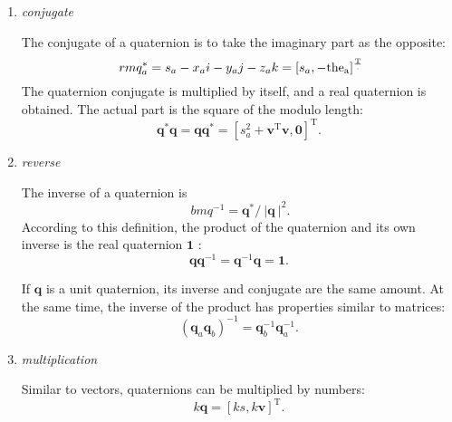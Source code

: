 \begin{enumerate}
	\item { \emph {conjugate} }
	
	The conjugate of a quaternion is to take the imaginary part as the opposite:
	\begin{equation}
	\ rm{q}_a ^ * = s_a - x_ai - y_aj - z_ak = [s_a, - \rm{the}_a] ^ \frac{T}.
	\end{equation}
	The quaternion conjugate is multiplied by itself, and a real quaternion is obtained. The actual part is the square of the modulo length:
	\begin{equation}
	\bm{q}^* \bm{q} = \bm{q} \bm{q}^* = [s_a^2+\bm{v}^\mathrm{T} \bm{v}, \bm{0} ]^\mathrm{T}.
	\end{equation}

	\item { \emph{reverse} }
	
	The inverse of a quaternion is
	\begin{equation}
	\label{eq:quaternionInverse}
	\ bm{q} ^ { - 1 } = \bm{q} ^ * / \ | \bm{q} \ | ^ 2 .       
	\end{equation}
	According to this definition, the product of the quaternion and its own inverse is the real quaternion $ \bm {1} $ :
	\begin{equation}
	\bm{q} \bm{q}^{-1} = \bm{q}^{-1} \bm{q} = \bm{1}.
	\end{equation}
	
	If $ \bm{q} $ is a unit quaternion, its inverse and conjugate are the same amount. At the same time, the inverse of the product has properties similar to matrices:
	\begin{equation}
	\left( \bm{q}_a \bm{q}_b \right)^{-1} = \bm{q}_b^{-1} \bm{q}_a^{-1}.
	\end{equation}
	
	\item { \emph {multiplication} }
	
	Similar to vectors, quaternions can be multiplied by numbers:
	\begin{equation}
	k \bm{q} = \left[ ks, k\bm{v} \right]^\mathrm{T}.
	\end{equation}
\end{enumerate}

